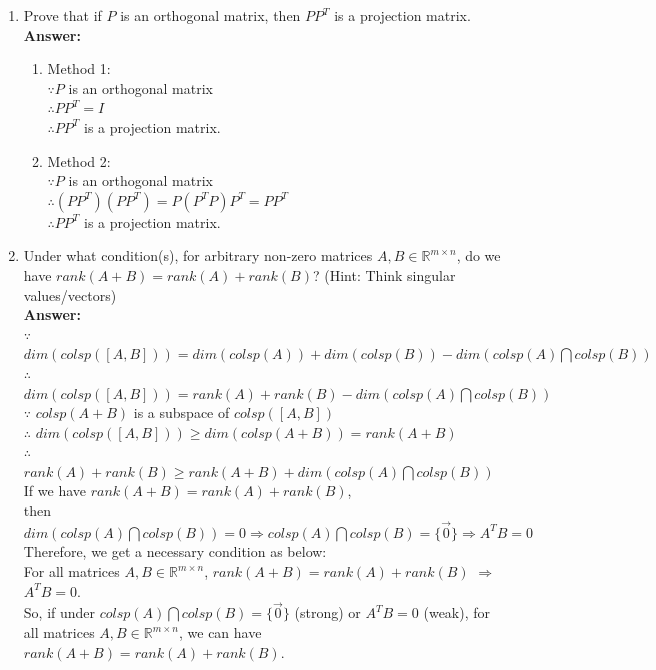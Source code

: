 \documentclass[letterpaper,11pt]{article}
\begin{document}
\begin{enumerate}
\item Prove that if $P$ is an orthogonal matrix, then $PP^T$ is a projection matrix.\\
\textbf{Answer:}
\begin{enumerate}
\item Method 1:\\
$\because P$ is an orthogonal matrix\\
$\therefore PP^T=I$\\
$\therefore PP^T$ is a projection matrix.
\item Method 2:\\
$\because P$ is an orthogonal matrix\\
$\therefore (PP^T)(PP^T)=P(P^TP)P^T=PP^T$\\
$\therefore PP^T$ is a projection matrix.
\end{enumerate}

\item Under what condition(s), for arbitrary non-zero matrices $A,B \in \mathbb{R}^{m \times n}$, do we have $rank(A + B) = rank(A) + rank(B)$? (Hint: Think singular values/vectors)\\
\textbf{Answer:}\\
$\because$ $dim(colsp([A,B]))=dim(colsp(A))+dim(colsp(B))-dim(colsp(A) \bigcap colsp(B))$\\
$\therefore$ $dim(colsp([A,B]))=rank(A)+rank(B)-dim(colsp(A) \bigcap colsp(B))$\\
$\because$ $colsp(A+B)$ is a subspace of $colsp([A,B])$\\
$\therefore$ $dim(colsp([A,B])) \geq dim(colsp(A+B)) = rank(A+B)$\\
$\therefore$ $rank(A)+rank(B) \geq rank(A+B) + dim(colsp(A) \bigcap colsp(B))$\\
If we have $rank(A+B)=rank(A)+rank(B)$,\\
then $dim(colsp(A) \bigcap colsp(B))=0 \Rightarrow colsp(A) \bigcap colsp(B)=\{\vec{0}\} \Rightarrow A^TB=0$\\
Therefore, we get a necessary condition as below:\\
For all matrices $A,B \in \mathbb{R}^{m \times n}$, $rank(A+B)=rank(A)+rank(B)$ $\Rightarrow$ $A^TB=0$.\\
So, if under $colsp(A) \bigcap colsp(B)=\{\vec{0}\}$ (strong) or $A^TB=0$ (weak), for all matrices $A,B \in \mathbb{R}^{m \times n}$, we can have $rank(A+B)=rank(A)+rank(B)$.


\end{enumerate}
\end{document}
